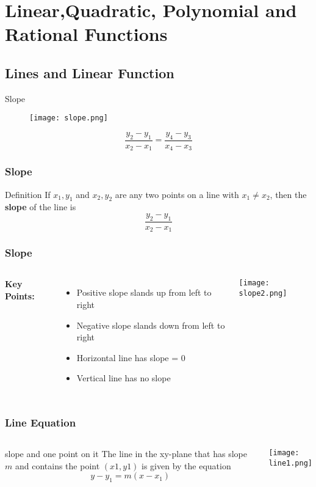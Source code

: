 \section{Linear,Quadratic, Polynomial and Rational Functions}
  \subsection{Lines and Linear Function}
  \begin{frame}{Slope}
    \begin{figure}
      \centering
      \texttt{[image: slope.png]}
    \end{figure}

    \[\frac{y_{2} - y_{1}}{x_{2} - x_{1}} = \frac{y_{4} - y_{3}}{x_{4} - x_{3}}\]
  \end{frame}
  \begin{frame}
    \frametitle{Slope}
    \begin{block}{Definition}
      If \(x_{1},y_{1}\) and \(x_{2},y_{2}\) are any two points on a line with \(x_{1} \neq x_{2}\), then the \textbf{slope}
      of the line is 
      \[\frac{y_{2} - y_{1}}{x_{2} - x_{1}}\] 
    \end{block}
  \end{frame}

  \begin{frame}
    \frametitle{Slope}
    
    \begin{columns} 
      \textbf{Key Points:}
      \begin{itemize}
          \item Positive slope slands up from left to right 
          \item Negative slope slands down from left to right 
          \item Horizontal line has slope = 0
          \item Vertical line has no slope
      \end{itemize}
  
      \centering
      \texttt{[image: slope2.png]} %
  \end{columns}
  \end{frame}

\begin{frame}
  \frametitle{Line Equation}
  \begin{columns} 
  \begin{alertblock}{slope and one point on it}
    The line in the xy-plane that has slope \(m\) and contains the point \((x1, y1)\) is given
by the equation 
\[y - y_{1} = m(x  -  x_{1})\]
  \end{alertblock}

  \centering
  \texttt{[image: line1.png]} %
  \end{columns}

\end{frame}

